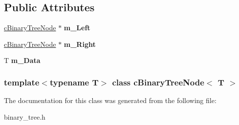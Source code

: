 \subsection*{\-Public \-Attributes}
\begin{DoxyCompactItemize}
\item 
\hypertarget{classcBinaryTreeNode_a62e29fcaccbb2ebd21f80d42f35c3423}{\hyperlink{classcBinaryTreeNode}{c\-Binary\-Tree\-Node} $\ast$ {\bfseries m\-\_\-\-Left}}\label{classcBinaryTreeNode_a62e29fcaccbb2ebd21f80d42f35c3423}

\item 
\hypertarget{classcBinaryTreeNode_a47d616ba011b71256666548d2d7903cd}{\hyperlink{classcBinaryTreeNode}{c\-Binary\-Tree\-Node} $\ast$ {\bfseries m\-\_\-\-Right}}\label{classcBinaryTreeNode_a47d616ba011b71256666548d2d7903cd}

\item 
\hypertarget{classcBinaryTreeNode_aa04bc6e4c65d705f99155a4d6d561bb9}{\-T {\bfseries m\-\_\-\-Data}}\label{classcBinaryTreeNode_aa04bc6e4c65d705f99155a4d6d561bb9}

\end{DoxyCompactItemize}
\subsubsection*{template$<$typename T$>$ class c\-Binary\-Tree\-Node$<$ T $>$}



\-The documentation for this class was generated from the following file\-:\begin{DoxyCompactItemize}
\item 
binary\-\_\-tree.\-h\end{DoxyCompactItemize}
